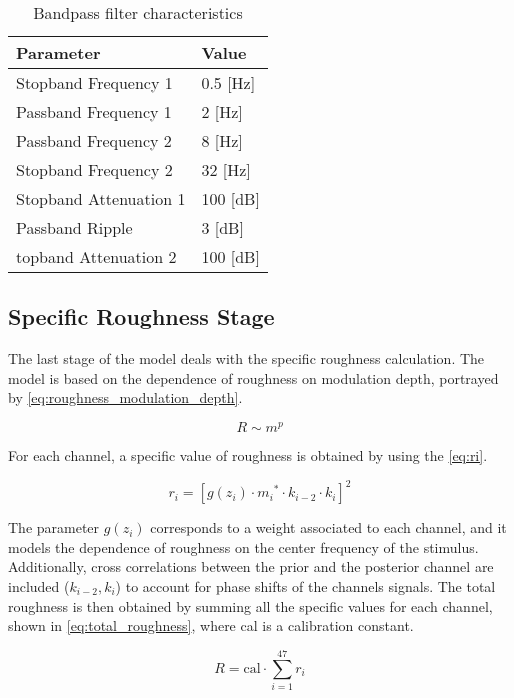 \documentclass[../main.tex]{subfiles}
\begin{document}
\begin{modelchapter}
\begin{table}[!ht]
  \centering
  \begin{tabu} to \linewidth{XX}
    \toprule
    \rowfont\bfseries
    Parameter & Value \\
    \midrule
    Stopband Frequency 1 & 0.5 [Hz] \\
    Passband Frequency 1 & 2 [Hz] \\
    Passband Frequency 2 & 8 [Hz] \\
    Stopband Frequency 2 & 32 [Hz] \\
    Stopband Attenuation 1 & 100 [dB] \\
    Passband Ripple & 3 [dB] \\
    topband Attenuation 2 & 100 [dB] \\
    \bottomrule
  \end{tabu}
  \caption{Bandpass filter characteristics}
  \label{tab:bandpass_filter}
\end{table}

\subsection{Specific Roughness Stage}

The last stage of the model deals with the specific roughness calculation. The
model is based on the dependence of roughness on modulation depth, portrayed
by \cref{eq:roughness_modulation_depth}.

\begin{equation}
  R \sim m^p
  \label{eq:roughness_modulation_depth}
\end{equation}

For each channel, a specific value of roughness is obtained by using the
\cref{eq:ri}.

\begin{equation}
  r_i = [g(z_i) \cdot {m_i}^* \cdot k_{i-2} \cdot k_i]^2
  \label{eq:ri}
\end{equation}

The parameter $g(z_i)$ corresponds to a weight associated to each channel, and
it models the dependence of roughness on the center frequency of the stimulus.
Additionally, cross correlations between the prior and the posterior channel
are included ($k_{i-2}, k_i$) to account for phase shifts of the channels
signals. The total roughness is then obtained by summing all the specific
values for each channel, shown in \cref{eq:total_roughness}, where cal is a
calibration constant.

\begin{equation}
  R = \text{cal} \cdot \displaystyle\sum_{i=1}^{47} r_i
  \label{eq:total_roughness}
\end{equation}


\end{modelchapter}
\end{document}
